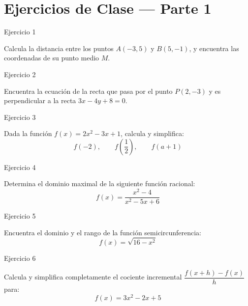 \documentclass[aspectratio=169]{beamer}
\begin{document}
\section{Ejercicios de Clase — Parte 1}

\begin{frame}{Ejercicio 1}
  \begin{mwejercicio}
    Calcula la distancia entre los puntos $A(-3, 5)$ y $B(5, -1)$, y encuentra las coordenadas de su punto medio $M$.
  \end{mwejercicio}
  \vspace{3.5cm}
\end{frame}
\begin{frame}{Ejercicio 2}
  \begin{mwejercicio}
    Encuentra la ecuación de la recta que pasa por el punto $P(2, -3)$ y es perpendicular a la recta $3x - 4y + 8 = 0$.
  \end{mwejercicio}
  \vspace{3.5cm}
\end{frame}
\begin{frame}{Ejercicio 3}
  \begin{mwejercicio}
    Dada la función $f(x) = 2x^2 - 3x + 1$, calcula y simplifica:
    $$f(-2), \qquad f\left(\frac{1}{2}\right), \qquad f(a + 1)$$
  \end{mwejercicio}
  \vspace{3.5cm}
\end{frame}
\begin{frame}{Ejercicio 4}
  \begin{mwejercicio}
    Determina el dominio maximal de la siguiente función racional:
    $$f(x) = \frac{x^2 - 4}{x^2 - 5x + 6}$$
  \end{mwejercicio}
  \vspace{3.5cm}
\end{frame}
\begin{frame}{Ejercicio 5}
  \begin{mwejercicio}
    Encuentra el dominio y el rango de la función semicircunferencia:
    $$f(x) = \sqrt{16 - x^2}$$
  \end{mwejercicio}
  \vspace{3.5cm}
\end{frame}
\begin{frame}{Ejercicio 6}
  \begin{mwejercicio}
    Calcula y simplifica completamente el cociente incremental $\dfrac{f(x + h) - f(x)}{h}$ para:
    $$f(x) = 3x^2 - 2x + 5$$
  \end{mwejercicio}
  \vspace{3.5cm}
\end{frame}
\end{document}
